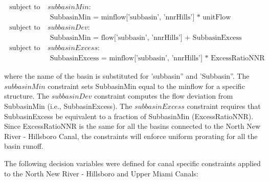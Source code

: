 \begin{equation}
 \begin{split}
  \textrm { subject to } &subbasinMin: \\
  &\textrm { SubbasinMin } = \textrm {  minflow['subbasin', 'nnrHills'] * unitFlow } \\  
  \textrm { subject to } &subbasinDev: \\
  &\textrm { SubbasinMin } = \textrm { flow['subbasin', 'nnrHills'] + SubbasinExcess } \\ 
  \textrm { subject to } &subbasinExcess: \\
  &\textrm { SubbasinExcess } =\textrm {  minflow['subbasin', 'nnrHills'] * ExcessRatioNNR }
 \end{split}
\end{equation}

where the name of the basin is substituted for \textrm {'subbasin''}
and \textrm {'Subbasin''}.  The $subbasinMin$ constraint sets \textrm
{SubbasinMin} equal to the minflow for a specific structure.  The
$subbasinDev$ constraint computes the flow deviation from \textrm
{SubbasinMin} (i.e., \textrm {SubbasinExcess}).  The $subbasinExcess$
constraint requires that \textrm {SubbasinExcess} be equivalent to a
fraction of \textrm {SubbasinMin} (\textrm {ExcessRatioNNR}).  Since
\textrm {ExcessRatioNNR} is the same for all the basins connected to
the North New River \-- Hillsboro Canal, the constraints will enforce uniform
prorating for all the basin runoff.  

The following decision variables were defined for canal specific
constraints applied to the North New River \-- Hillsboro and Upper
Miami Canals:

